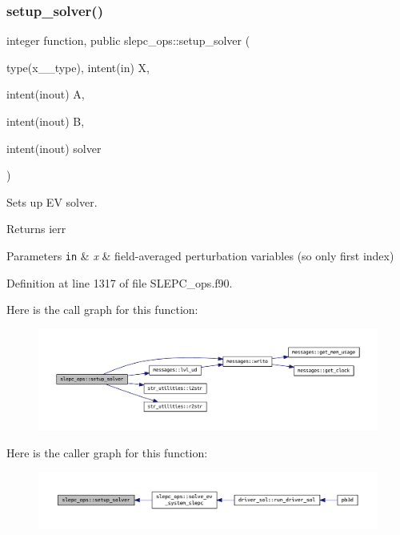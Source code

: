 \subsubsection{\texorpdfstring{setup\+\_\+solver()}{setup\_solver()}}
{\footnotesize\ttfamily integer function, public slepc\+\_\+ops\+::setup\+\_\+solver (\begin{DoxyParamCaption}\item[{type(x\+\_\+2\+\_\+type), intent(in)}]{X,  }\item[{intent(inout)}]{A,  }\item[{intent(inout)}]{B,  }\item[{intent(inout)}]{solver }\end{DoxyParamCaption})}



Sets up EV solver. 

\begin{DoxyReturn}{Returns}
ierr
\end{DoxyReturn}

\begin{DoxyParams}[1]{Parameters}
\mbox{\tt in}  & {\em x} & field-\/averaged perturbation variables (so only first index) \\
\hline
\end{DoxyParams}


Definition at line 1317 of file S\+L\+E\+P\+C\+\_\+ops.\+f90.

Here is the call graph for this function\+:\nopagebreak
\begin{figure}[H]
\begin{center}
\leavevmode
\includegraphics[width=350pt]{namespaceslepc__ops_af2eb258cbc9d353b95fa71d38570afad_cgraph}
\end{center}
\end{figure}
Here is the caller graph for this function\+:\nopagebreak
\begin{figure}[H]
\begin{center}
\leavevmode
\includegraphics[width=350pt]{namespaceslepc__ops_af2eb258cbc9d353b95fa71d38570afad_icgraph}
\end{center}
\end{figure}
\mbox{\label{namespaceslepc__ops_a79c420987056c225931b51c8d30ece1f}} 
